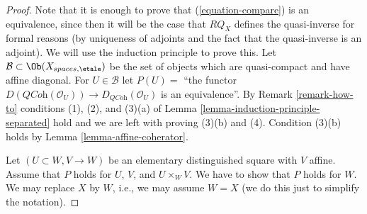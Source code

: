 \begin{proof}
Note that it is enough to prove that (\ref{equation-compare}) is
an equivalence, since then it will be the case that $RQ_X$ defines
the quasi-inverse for formal reasons (by uniqueness of adjoints and
the fact that the quasi-inverse is an adjoint).
We will use the induction principle to prove this. Let
$\mathcal{B} \subset \Ob(X_{spaces, \etale})$ be the set of
objects which are quasi-compact and have affine diagonal.
For $U \in \mathcal{B}$ let $P(U) =$ ``the functor
$D(\textit{QCoh}(\mathcal{O}_U)) \to D_{\textit{QCoh}}(\mathcal{O}_U)$
is an equivalence''.
By Remark \ref{remark-how-to} conditions (1), (2), and (3)(a) of
Lemma \ref{lemma-induction-principle-separated} hold and we are
left with proving (3)(b) and (4). Condition (3)(b) holds by
Lemma \ref{lemma-affine-coherator}.

\medskip\noindent
Let $(U \subset W, V \to W)$ be an elementary distinguished square
with $V$ affine. Assume that $P$ holds for $U$, $V$, and $U \times_W V$.
We have to show that $P$ holds for $W$. We may replace $X$ by $W$, i.e.,
we may assume $W = X$ (we do this just to simplify the notation).


\end{proof}
